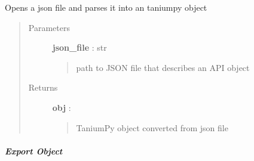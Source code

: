 \documentclass[letterpaper,10pt,english]{sphinxmanual}
\begin{document}
\begin{fulllineitems}
\label{pytan.handler:pytan.handler.Handler.load_taniumpy_from_json}
Opens a json file and parses it into an taniumpy object
\begin{quote}\begin{description}
\item[{Parameters}] \leavevmode
\textbf{json\_file} : str
\begin{quote}

path to JSON file that describes an API object
\end{quote}

\item[{Returns}] \leavevmode
\textbf{obj} : {\hyperref[taniumpy.object_types:taniumpy.object_types.base.BaseType]{}}
\begin{quote}

TaniumPy object converted from json file
\end{quote}

\end{description}\end{quote}

\end{fulllineitems}



\subparagraph{Export Object}
\label{pytan.handler:export-object}
\end{document}
